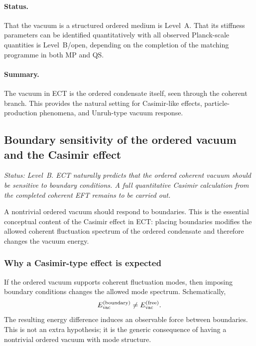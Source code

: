 \paragraph{Status.}
That the vacuum is a structured ordered medium is Level~A.
That its stiffness parameters can be identified quantitatively with
all observed Planck-scale quantities is Level~B/open, depending on
the completion of the matching programme in both MP and QS.

\paragraph{Summary.}
The vacuum in ECT is the ordered condensate itself, seen through the
coherent branch.
This provides the natural setting for Casimir-like effects,
particle-production phenomena, and Unruh-type vacuum response.

\subsection{Boundary sensitivity of the ordered vacuum and the Casimir effect}
\label{sec:qs_casimir}

\textit{Status: Level~B.
ECT naturally predicts that the ordered coherent vacuum should be
sensitive to boundary conditions.
A full quantitative Casimir calculation from the completed coherent
EFT remains to be carried out.}

\medskip
A nontrivial ordered vacuum should respond to boundaries.
This is the essential conceptual content of the Casimir effect in ECT:
placing boundaries modifies the allowed coherent fluctuation spectrum
of the ordered condensate and therefore changes the vacuum energy.

\subsubsection*{Why a Casimir-type effect is expected}

If the ordered vacuum supports coherent fluctuation modes, then
imposing boundary conditions changes the allowed mode spectrum.
Schematically,
\begin{equation}
  \label{eq:qs_casimir_modes}
  E_{\rm vac}^{\rm(boundary)}
  \neq
  E_{\rm vac}^{\rm(free)}.
\end{equation}
The resulting energy difference induces an observable force between
boundaries.
This is not an extra hypothesis; it is the generic consequence of
having a nontrivial ordered vacuum with mode structure.

